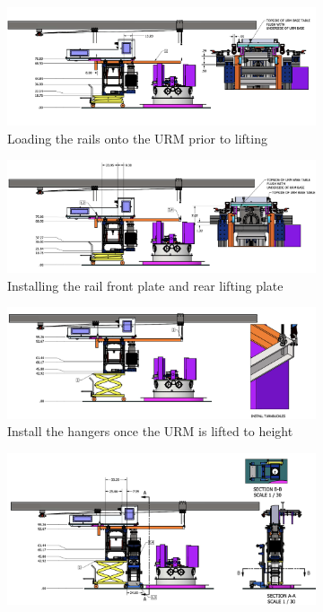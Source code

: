 \documentclass[11pt]{article}
\begin{document}
\begin{figure}
  \begin{subfigure}{0.85\textwidth}
    \includegraphics[width=\textwidth]{Figures/URMSecureLoadRails}
    \caption{Loading the rails onto the URM prior to lifting}
    \label{fig:URMRails}
  \end{subfigure}
  \begin{subfigure}{0.85\textwidth}
    \includegraphics[width=\textwidth]{Figures/URMLoweredInstallRailHardware}
    \caption{Installing the rail front plate and rear lifting plate}
    \label{fig:URMRailHardware}
  \end{subfigure}
  \begin{subfigure}{0.85\textwidth}
    \includegraphics[width=\textwidth]{Figures/URMLiftedInstalHangers}
    \caption{Install the hangers once the URM is lifted to height}
    \label{fig:URMlifted}
  \end{subfigure}
  \begin{subfigure}{0.8\textwidth}
    \includegraphics[width=\textwidth]{Figures/URMHungWithSCV}

\end{subfigure}
\end{figure}
\end{document}
